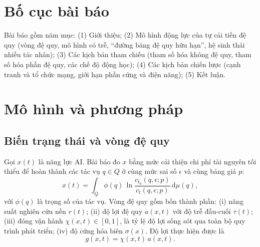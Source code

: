 \documentclass[12pt,a4paper,openany]{report}
\numberwithin{equation}{chapter}   %
\theoremstyle{definition}
\newcommand{\dd}{\mathrm{d}}
\begin{document}
\section{Bố cục bài báo}\label{sec:bocuc}
Bài báo gồm năm mục: (1) Giới thiệu; (2) Mô hình động lực của tự cải tiến đệ quy (vòng đệ quy, mô hình có trễ, ``đường băng đệ quy hữu hạn'', hệ sinh thái nhiều tác nhân); (3) Các kịch bản tham chiếu (tham số hóa không đệ quy, tham số hóa phần đệ quy, các chế độ động học); (4) Các kịch bản chiến lược (cạnh tranh và tổ chức mạng, giới hạn phần cứng và điện năng); (5) Kết luận.

\section{Mô hình và phương pháp}\label{sec:mohinh}
\subsection{Biến trạng thái và vòng đệ quy}
Gọi $x(t)$ là năng lực AI. Bài báo đo $x$ bằng mức cải thiện chi phí tài nguyên tối thiểu để hoàn thành các tác vụ $q\in Q$ ở cùng mức sai số $\epsilon$ và cùng bảng giá $p$:
\begin{equation}
  x(t) = \int_{Q} \phi(q)\,\ln\frac{c_{t_0}(q,\epsilon;p)}{c_{t}(q,\epsilon;p)}\,\dd\mu(q),
  \label{eq:x}
\end{equation}
với $\phi(q)$ là trọng số của tác vụ. Vòng đệ quy gồm bốn thành phần: (i) năng suất nghiên cứu nền $r(t)$; (ii) độ lợi đệ quy $a(x,t)$ với độ trễ đầu-cuối $\tau(t)$; (iii) đóng vận hành $\chi(x,t)\in[0,1]$, là tỷ lệ độ lợi sống sót qua toàn bộ quy trình phát triển; (iv) độ cứng hóa biên $\sigma(x)$. Độ lợi thực hiện được là
\begin{equation}
  g(x,t) = \chi(x,t)\,a(x,t).
  \label{eq:g}
\end{equation}
\end{document}
